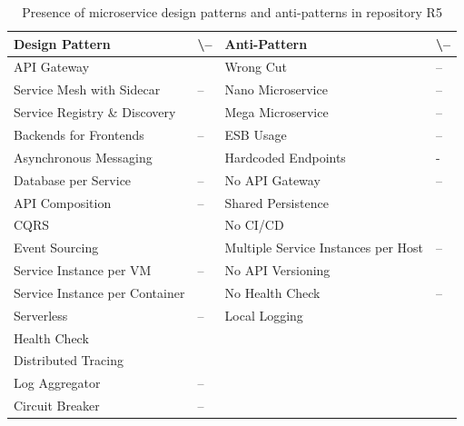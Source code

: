 \documentclass{Configuration_Files/PoliMi3i_thesis}
\newcommand{\cmark}{\ding{51}}%
\begin{document}
\begin{table}[H]
\centering 
    \begin{tabular}{ 
  | >{\centering\arraybackslash} m{16em} 
  | >{\centering\arraybackslash} m{2.2em} 
  | >{\centering\arraybackslash} m{16em} 
  | >{\centering\arraybackslash} m{2.2em} | }
    \hline
    \rowcolor{bluepoli!40}
    \textbf{Design Pattern} & \cmark \textbackslash – & \textbf{Anti-Pattern} & \cmark \textbackslash – \T\B \\
    \hline \hline
    API Gateway & \cmark & Wrong Cut & – \T\B\\
    \hline
    \rowcolor{bluepoli!10}
    Service Mesh with Sidecar & – & Nano Microservice & – \T\B \\
    \hline
    Service Registry \& Discovery & \cmark & Mega Microservice & – \T\B \\
    \hline
    \rowcolor{bluepoli!10}
    Backends for Frontends & – & ESB Usage & – \T\B \\
    \hline
    Asynchronous Messaging & \cmark & Hardcoded Endpoints & - \T\B \\
    \hline
    \rowcolor{bluepoli!10}
    Database per Service & – & No API Gateway & – \T\B \\
    \hline
    API Composition & – & Shared Persistence & \cmark \T\B \\
    \hline
    \rowcolor{bluepoli!10}
    CQRS & \cmark & No CI/CD & \cmark \T\B \\
    \hline
    Event Sourcing & \cmark & Multiple Service Instances per Host & – \T\B \\
    \hline
    \rowcolor{bluepoli!10}
    Service Instance per VM & – & No API Versioning & \cmark \T\B \\
    \hline
    Service Instance per Container & \cmark & No Health Check & – \T\B \\
    \hline
    \rowcolor{bluepoli!10}
    Serverless & – & Local Logging & \cmark \T\B \\
    \hline
    Health Check & \cmark &  & \T\B \\
    \hline
    \rowcolor{bluepoli!10}
    Distributed Tracing & \cmark & & \T\B \\
    \hline
    Log Aggregator & – &  & \T\B \\
    \hline
    \rowcolor{bluepoli!10}
    Circuit Breaker & – &  & \T\B \\
    \hline
    \end{tabular}
    \\[10pt]
    \caption{Presence of microservice design patterns and anti-patterns in repository R5}
    \label{table:R5_result}
\end{table}
\end{document}

